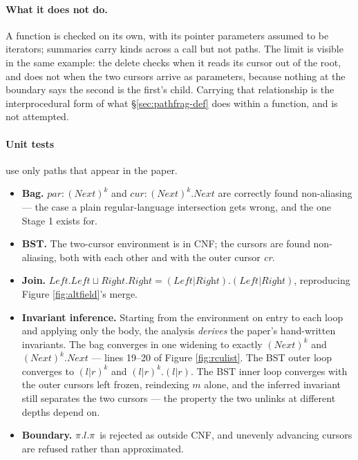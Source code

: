 \paragraph{What it does not do.}  A function is checked on its own, with its
pointer parameters assumed to be iterators; summaries carry kinds across a call
but not paths.  The limit is visible in the same example: the delete checks when
it reads its cursor out of the root, and does not when the two cursors arrive as
parameters, because nothing at the boundary says the second is the first's
child.  Carrying that relationship is the interprocedural form of what
\S\ref{sec:pathfrag-def} does within a function, and is not attempted.

\paragraph{Unit tests} use only paths that appear in the paper.
\begin{itemize}
\item \textbf{Bag.}  $\textit{par} : (\textit{Next})^{k}$ and $\textit{cur} :
  (\textit{Next})^{k}.\textit{Next}$ are correctly found non-aliasing --- the
  case a plain regular-language intersection gets wrong, and the one Stage 1
  exists for.
\item \textbf{BST.}  The two-cursor environment is in CNF; the cursors are found
  non-aliasing, both with each other and with the outer cursor \textit{cr}.
\item \textbf{Join.}  $\textit{Left}.\textit{Left} \sqcup
  \textit{Right}.\textit{Right} = (\textit{Left}|\textit{Right}).(\textit{Left}|\textit{Right})$,
  reproducing Figure \ref{fig:altfield}'s merge.
\item \textbf{Invariant inference.}  Starting from the environment on entry to
  each loop and applying only the body, the analysis \emph{derives} the paper's
  hand-written invariants.  The bag converges in one widening to exactly
  $(\textit{Next})^{k}$ and $(\textit{Next})^{k}.\textit{Next}$ --- lines 19--20
  of Figure \ref{fig:rculist}.  The BST outer loop converges to $(l|r)^{k}$ and
  $(l|r)^{k}.(l|r)$.  The BST inner loop converges with the outer cursors left
  frozen, reindexing $m$ alone, and the inferred invariant still separates the
  two cursors --- the property the two unlinks at different depths depend on.
\item \textbf{Boundary.}  $\pi . l . \pi$ is rejected as outside CNF, and
  unevenly advancing cursors are refused rather than approximated.
\end{itemize}

